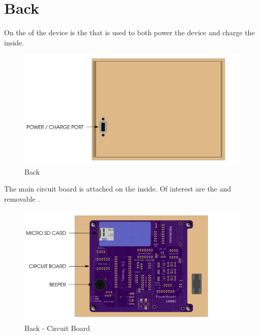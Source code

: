 
\chapter{Back} \label{Back}

On the  of the device is the  that is used to both power the
device and charge the \hyperref[Rechargeable Battery]{} inside.

\begin{figure}[H]
\centering
  \includegraphics{images/back.png}
\caption{Back}
\end{figure}

The main circuit board is attached on the inside.  Of interest are
the  and removable .

\begin{figure}[H]
\centering
  \includegraphics{images/back_circuit_board.png}
\caption{Back - Circuit Board}
\end{figure}

